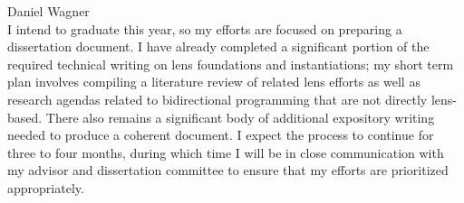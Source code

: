 \documentclass{article}
\begin{document}
{\noindent Daniel Wagner}\\[0ex]

I intend to graduate this year, so my efforts are focused on preparing a
dissertation document. I have already completed a significant portion of the
required technical writing on lens foundations and instantiations; my short
term plan involves compiling a literature review of related lens efforts as
well as research agendas related to bidirectional programming that are not
directly lens-based. There also remains a significant body of additional
expository writing needed to produce a coherent document. I expect the
process to continue for three to four months, during which time I will be in
close communication with my advisor and dissertation committee to ensure
that my efforts are prioritized appropriately.
\end{document}
